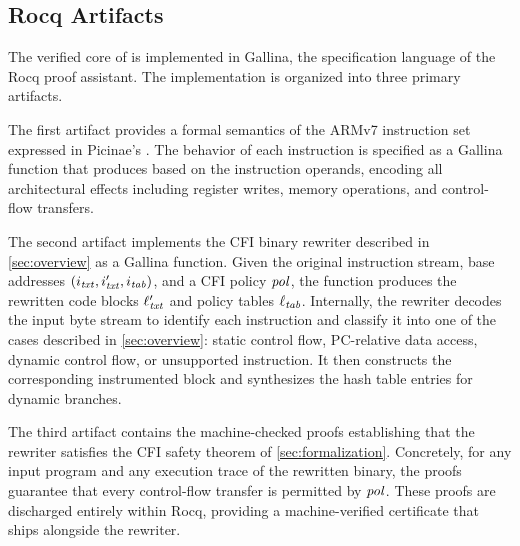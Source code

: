 \subsection{Rocq Artifacts}

The verified core of \pname is implemented in Gallina, the specification language of the Rocq proof assistant.
The implementation is organized into three primary artifacts.

The first artifact provides a formal semantics of the ARMv7 instruction set expressed in Picinae's \IL.
The behavior of each instruction is specified as a Gallina function that produces \IL based on the instruction operands, encoding all architectural effects including register writes, memory operations, and control-flow transfers.

The second artifact implements the CFI binary rewriter described in \autoref{sec:overview} as a Gallina function.
Given the original instruction stream, base addresses $(i_\mathit{txt}, i'_\mathit{txt}, i_\mathit{tab})$, and a CFI policy $\mathit{pol}$, the function produces the rewritten code blocks $\ell'_\mathit{txt}$ and policy tables $\ell_\mathit{tab}$.
Internally, the rewriter decodes the input byte stream to identify each instruction and classify it into one of the cases described in \autoref{sec:overview}: static control flow, PC-relative data access, dynamic control flow, or unsupported instruction.
It then constructs the corresponding instrumented block and synthesizes the hash table entries for dynamic branches.

The third artifact contains the machine-checked proofs establishing that the rewriter satisfies the CFI safety theorem of \autoref{sec:formalization}.
Concretely, for any input program and any execution trace of the rewritten binary, the proofs guarantee that every control-flow transfer is permitted by $\mathit{pol}$.
These proofs are discharged entirely within Rocq, providing a machine-verified certificate that ships alongside the rewriter.


